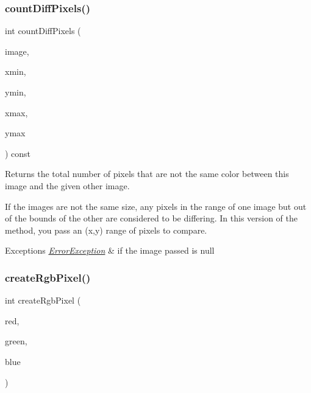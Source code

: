 \subsubsection{\texorpdfstring{count\+Diff\+Pixels()}{countDiffPixels()}\hspace{0.1cm}{\footnotesize\ttfamily [4/4]}}
{\footnotesize\ttfamily int count\+Diff\+Pixels (\begin{DoxyParamCaption}\item[{const \mbox{\hyperlink{classGCanvas}{G\+Canvas}} $\ast$}]{image,  }\item[{int}]{xmin,  }\item[{int}]{ymin,  }\item[{int}]{xmax,  }\item[{int}]{ymax }\end{DoxyParamCaption}) const\hspace{0.3cm}{\ttfamily [virtual]}}



Returns the total number of pixels that are not the same color between this image and the given other image. 

If the images are not the same size, any pixels in the range of one image but out of the bounds of the other are considered to be differing. In this version of the method, you pass an (x,y) range of pixels to compare. 
\begin{DoxyExceptions}{Exceptions}
{\em \mbox{\hyperlink{classErrorException}{Error\+Exception}}} & if the image passed is null \\
\hline
\end{DoxyExceptions}
\mbox{\label{classGCanvas_a10beefcf8631433d0cdddefd4e24c76a}} 
\subsubsection{\texorpdfstring{create\+Rgb\+Pixel()}{createRgbPixel()}}
{\footnotesize\ttfamily int create\+Rgb\+Pixel (\begin{DoxyParamCaption}\item[{int}]{red,  }\item[{int}]{green,  }\item[{int}]{blue }\end{DoxyParamCaption})\hspace{0.3cm}{\ttfamily [static]}}



